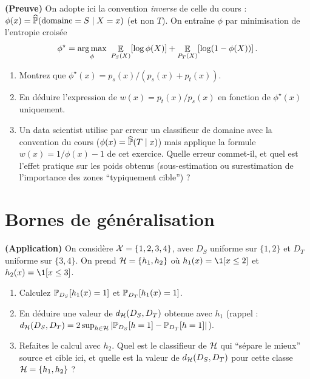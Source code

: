\documentclass[11pt]{article}
\begin{document}
\begin{exercise} \textbf{(Preuve)}
\label{ex:iwc-td}
On adopte ici la convention \emph{inverse} de celle du cours : $\phi(x) = \widehat\P(\text{domaine}=S
\mid X=x)$ (et non $T$). On entraîne $\phi$ par minimisation de l'entropie croisée
\[
\phi^\star = \argmax_{\phi}\ \Esp{P_S(X)}{\log\phi(X)} + \Esp{P_T(X)}{\log(1-\phi(X))}.
\]
\begin{enumerate}[label=(\alph*)]
\item Montrez que $\phi^\star(x) = p_s(x)/(p_s(x)+p_t(x))$.
\item En déduire l'expression de $w(x)=p_t(x)/p_s(x)$ en fonction de $\phi^\star(x)$ uniquement.
\item Un data scientist utilise par erreur un classifieur de domaine avec la convention du cours
($\phi(x)=\widehat\P(T\mid x)$) mais applique la formule $w(x)=1/\phi(x)-1$ de cet exercice. Quelle erreur
commet-il, et quel est l'effet pratique sur les poids obtenus (sous-estimation ou surestimation de
l'importance des zones \enquote{typiquement cible}) ?
\end{enumerate}
\end{exercise}

\section{Bornes de généralisation}

\begin{exercise} \textbf{(Application)}
On considère $\X=\{1,2,3,4\}$, avec $D_S$ uniforme sur $\{1,2\}$ et $D_T$ uniforme sur $\{3,4\}$. On prend
$\Hcal = \{h_1, h_2\}$ où $h_1(x) = \1[x\le 2]$ et $h_2(x)=\1[x\le 3]$.
\begin{enumerate}[label=(\alph*)]
\item Calculez $\P_{D_S}[h_1(x)=1]$ et $\P_{D_T}[h_1(x)=1]$.
\item En déduire une valeur de $d_\Hcal(D_S,D_T)$ obtenue avec $h_1$ (rappel :
$d_\Hcal(D_S,D_T)=2\sup_{h\in\Hcal}|\P_{D_S}[h=1]-\P_{D_T}[h=1]|$).
\item Refaites le calcul avec $h_2$. Quel est le classifieur de $\Hcal$ qui \enquote{sépare le mieux}
source et cible ici, et quelle est la valeur de $d_\Hcal(D_S,D_T)$ pour cette classe $\Hcal=\{h_1,h_2\}$ ?
\end{enumerate}
\end{exercise}
\end{document}
